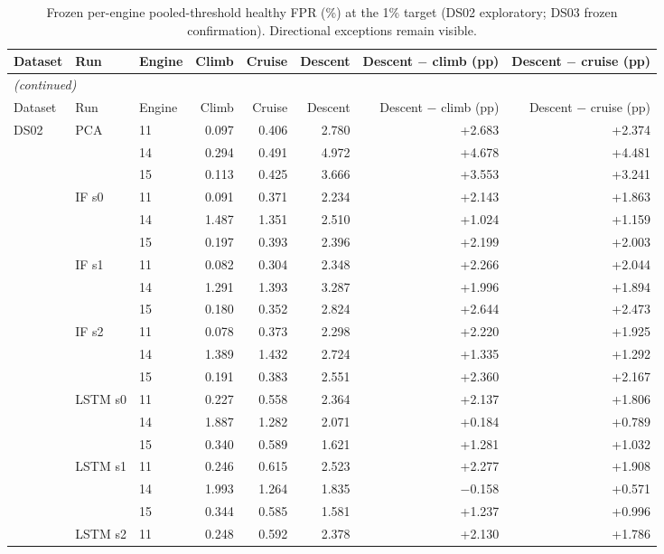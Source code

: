 \begin{footnotesize}
\begin{longtable}{lllrrrrr}
\caption{Frozen per-engine pooled-threshold healthy FPR (\%) at the 1\% target (DS02 exploratory; DS03 frozen confirmation). Directional exceptions remain visible.}\label{tab:s5_per_engine}\\
\toprule
Dataset & Run & Engine & Climb & Cruise & Descent & Descent $-$ climb (pp) & Descent $-$ cruise (pp) \\
\midrule
\endfirsthead
\multicolumn{8}{l}{\emph{(continued)}}\\
\toprule
Dataset & Run & Engine & Climb & Cruise & Descent & Descent $-$ climb (pp) & Descent $-$ cruise (pp) \\
\midrule
\endhead
\bottomrule
\endfoot
DS02 & PCA & 11 & 0.097 & 0.406 & 2.780 & +2.683 & +2.374 \\
 &  & 14 & 0.294 & 0.491 & 4.972 & +4.678 & +4.481 \\
 &  & 15 & 0.113 & 0.425 & 3.666 & +3.553 & +3.241 \\
 & IF s0 & 11 & 0.091 & 0.371 & 2.234 & +2.143 & +1.863 \\
 &  & 14 & 1.487 & 1.351 & 2.510 & +1.024 & +1.159 \\
 &  & 15 & 0.197 & 0.393 & 2.396 & +2.199 & +2.003 \\
 & IF s1 & 11 & 0.082 & 0.304 & 2.348 & +2.266 & +2.044 \\
 &  & 14 & 1.291 & 1.393 & 3.287 & +1.996 & +1.894 \\
 &  & 15 & 0.180 & 0.352 & 2.824 & +2.644 & +2.473 \\
 & IF s2 & 11 & 0.078 & 0.373 & 2.298 & +2.220 & +1.925 \\
 &  & 14 & 1.389 & 1.432 & 2.724 & +1.335 & +1.292 \\
 &  & 15 & 0.191 & 0.383 & 2.551 & +2.360 & +2.167 \\
 & LSTM s0 & 11 & 0.227 & 0.558 & 2.364 & +2.137 & +1.806 \\
 &  & 14 & 1.887 & 1.282 & 2.071 & +0.184 & +0.789 \\
 &  & 15 & 0.340 & 0.589 & 1.621 & +1.281 & +1.032 \\
 & LSTM s1 & 11 & 0.246 & 0.615 & 2.523 & +2.277 & +1.908 \\
 &  & 14 & 1.993 & 1.264 & 1.835 & $-$0.158 & +0.571 \\
 &  & 15 & 0.344 & 0.585 & 1.581 & +1.237 & +0.996 \\
 & LSTM s2 & 11 & 0.248 & 0.592 & 2.378 & +2.130 & +1.786 \\

\end{longtable}
\end{footnotesize}
